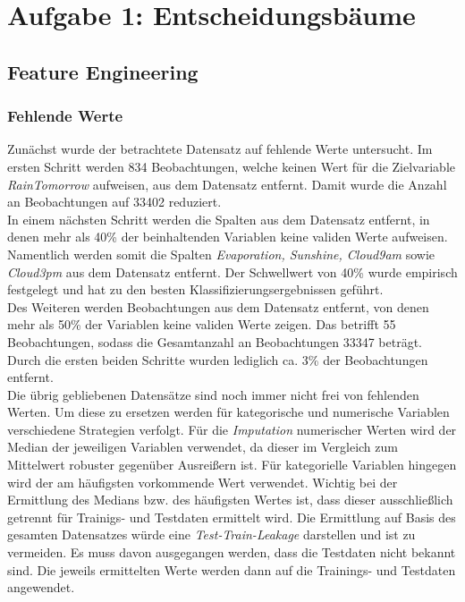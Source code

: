 \section{Aufgabe 1: Entscheidungsbäume}
\subsection{Feature Engineering}
\subsubsection{Fehlende Werte}

Zunächst wurde der betrachtete Datensatz auf fehlende Werte untersucht. Im ersten Schritt werden 834 Beobachtungen, welche keinen Wert für die Zielvariable \emph{RainTomorrow} aufweisen, aus dem Datensatz entfernt. Damit wurde die Anzahl an Beobachtungen auf 33402 reduziert.\\
\noindent \hspace*{7mm}
In einem nächsten Schritt werden die Spalten aus dem Datensatz entfernt, in denen mehr als 40\% der beinhaltenden Variablen keine validen Werte aufweisen. Namentlich werden somit die Spalten \emph{Evaporation, Sunshine, Cloud9am} sowie \emph{Cloud3pm} aus dem Datensatz entfernt. Der Schwellwert von 40\% wurde empirisch festgelegt und hat zu den besten Klassifizierungsergebnissen geführt.\\
\noindent \hspace*{7mm}
Des Weiteren werden Beobachtungen aus dem Datensatz entfernt, von denen mehr als 50\% der Variablen keine validen Werte zeigen. Das betrifft 55 Beobachtungen, sodass die Gesamtanzahl an Beobachtungen 33347 beträgt. Durch die ersten beiden Schritte wurden lediglich ca. 3\% der Beobachtungen entfernt.\\
\noindent \hspace*{7mm}
Die übrig gebliebenen Datensätze sind noch immer nicht frei von fehlenden Werten. Um diese zu ersetzen werden für kategorische und numerische Variablen verschiedene Strategien verfolgt. Für die \emph{Imputation} numerischer Werten wird der Median der jeweiligen Variablen verwendet, da dieser im Vergleich zum Mittelwert robuster gegenüber Ausreißern ist. Für kategorielle Variablen hingegen wird der am häufigsten vorkommende Wert verwendet. Wichtig bei der Ermittlung des Medians bzw. des häufigsten Wertes ist, dass dieser ausschließlich getrennt für Trainigs- und Testdaten ermittelt wird. Die Ermittlung auf Basis des gesamten Datensatzes würde eine \emph{Test-Train-Leakage} darstellen und ist zu vermeiden. Es muss davon ausgegangen werden, dass die Testdaten nicht bekannt sind. Die jeweils ermittelten Werte werden dann auf die Trainings- und Testdaten angewendet.

